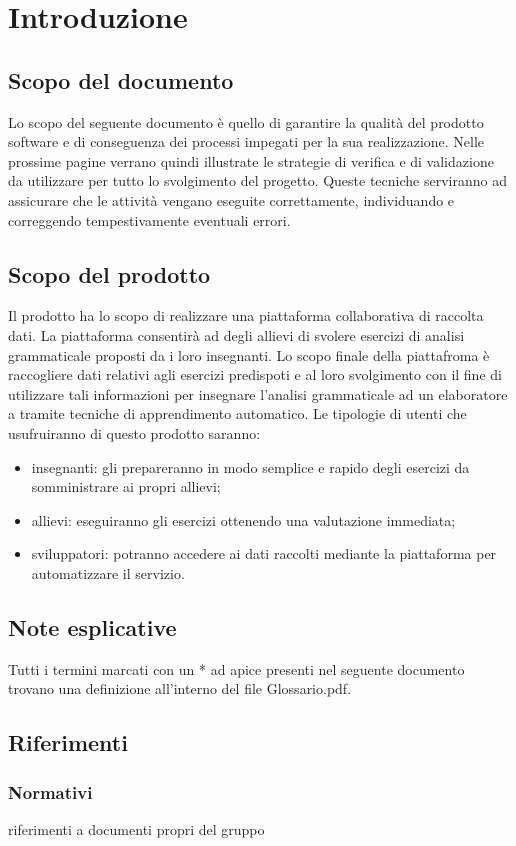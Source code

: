 \section{Introduzione}
\subsection{Scopo del documento}
Lo scopo del seguente documento è quello di garantire la qualità del prodotto software e di conseguenza dei processi impegati per la sua realizzazione. Nelle prossime pagine verrano quindi illustrate le strategie di verifica e di validazione da utilizzare per tutto lo svolgimento del progetto. Queste tecniche serviranno ad assicurare che le attività vengano eseguite correttamente, individuando e correggendo tempestivamente eventuali errori.
\subsection{Scopo del prodotto}
Il prodotto ha lo scopo di realizzare una piattaforma collaborativa di raccolta dati.  La piattaforma consentirà ad degli allievi di svolere esercizi di analisi grammaticale proposti da i loro insegnanti.
Lo scopo finale della piattafroma è raccogliere dati relativi agli esercizi predispoti e al loro svolgimento con il fine di utilizzare tali informazioni per insegnare l'analisi grammaticale ad un elaboratore a tramite tecniche di apprendimento automatico.
Le tipologie di utenti che usufruiranno di questo prodotto saranno:
\begin{itemize}
	\item insegnanti: gli prepareranno in modo semplice e rapido degli esercizi da somministrare ai propri allievi;
	\item allievi: eseguiranno gli esercizi ottenendo una valutazione immediata;
	\item sviluppatori: potranno accedere ai dati raccolti mediante la piattaforma per
	automatizzare il servizio.
\end{itemize}
\subsection{Note esplicative}
Tutti i termini marcati con un * ad apice presenti nel seguente documento trovano una definizione all'interno del file Glossario.pdf.
\subsection{Riferimenti}
\subsubsection{Normativi}
riferimenti a documenti propri del gruppo
